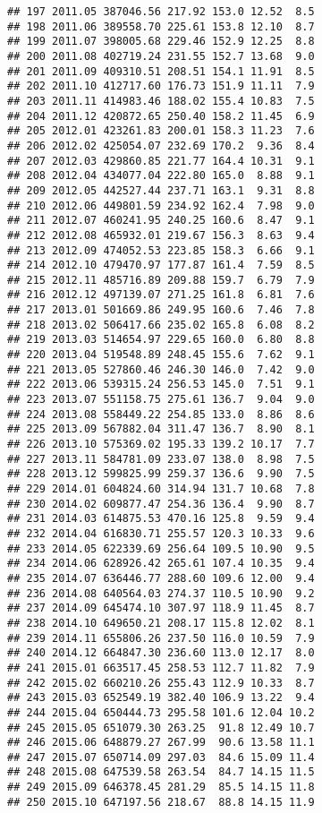 \documentclass[]{article}
\begin{document}
\begin{verbatim}
## 197 2011.05 387046.56 217.92 153.0 12.52  8.5
## 198 2011.06 389558.70 225.61 153.8 12.10  8.7
## 199 2011.07 398005.68 229.46 152.9 12.25  8.8
## 200 2011.08 402719.24 231.55 152.7 13.68  9.0
## 201 2011.09 409310.51 208.51 154.1 11.91  8.5
## 202 2011.10 412717.60 176.73 151.9 11.11  7.9
## 203 2011.11 414983.46 188.02 155.4 10.83  7.5
## 204 2011.12 420872.65 250.40 158.2 11.45  6.9
## 205 2012.01 423261.83 200.01 158.3 11.23  7.6
## 206 2012.02 425054.07 232.69 170.2  9.36  8.4
## 207 2012.03 429860.85 221.77 164.4 10.31  9.1
## 208 2012.04 434077.04 222.80 165.0  8.88  9.1
## 209 2012.05 442527.44 237.71 163.1  9.31  8.8
## 210 2012.06 449801.59 234.92 162.4  7.98  9.0
## 211 2012.07 460241.95 240.25 160.6  8.47  9.1
## 212 2012.08 465932.01 219.67 156.3  8.63  9.4
## 213 2012.09 474052.53 223.85 158.3  6.66  9.1
## 214 2012.10 479470.97 177.87 161.4  7.59  8.5
## 215 2012.11 485716.89 209.88 159.7  6.79  7.9
## 216 2012.12 497139.07 271.25 161.8  6.81  7.6
## 217 2013.01 501669.86 249.95 160.6  7.46  7.8
## 218 2013.02 506417.66 235.02 165.8  6.08  8.2
## 219 2013.03 514654.97 229.65 160.0  6.80  8.8
## 220 2013.04 519548.89 248.45 155.6  7.62  9.1
## 221 2013.05 527860.46 246.30 146.0  7.42  9.0
## 222 2013.06 539315.24 256.53 145.0  7.51  9.1
## 223 2013.07 551158.75 275.61 136.7  9.04  9.0
## 224 2013.08 558449.22 254.85 133.0  8.86  8.6
## 225 2013.09 567882.04 311.47 136.7  8.90  8.1
## 226 2013.10 575369.02 195.33 139.2 10.17  7.7
## 227 2013.11 584781.09 233.07 138.0  8.98  7.5
## 228 2013.12 599825.99 259.37 136.6  9.90  7.5
## 229 2014.01 604824.60 314.94 131.7 10.68  7.8
## 230 2014.02 609877.47 254.36 136.4  9.90  8.7
## 231 2014.03 614875.53 470.16 125.8  9.59  9.4
## 232 2014.04 616830.71 255.57 120.3 10.33  9.6
## 233 2014.05 622339.69 256.64 109.5 10.90  9.5
## 234 2014.06 628926.42 265.61 107.4 10.35  9.4
## 235 2014.07 636446.77 288.60 109.6 12.00  9.4
## 236 2014.08 640564.03 274.37 110.5 10.90  9.2
## 237 2014.09 645474.10 307.97 118.9 11.45  8.7
## 238 2014.10 649650.21 208.17 115.8 12.02  8.1
## 239 2014.11 655806.26 237.50 116.0 10.59  7.9
## 240 2014.12 664847.30 236.60 113.0 12.17  8.0
## 241 2015.01 663517.45 258.53 112.7 11.82  7.9
## 242 2015.02 660210.26 255.43 112.9 10.33  8.7
## 243 2015.03 652549.19 382.40 106.9 13.22  9.4
## 244 2015.04 650444.73 295.58 101.6 12.04 10.2
## 245 2015.05 651079.30 263.25  91.8 12.49 10.7
## 246 2015.06 648879.27 267.99  90.6 13.58 11.1
## 247 2015.07 650714.09 297.03  84.6 15.09 11.4
## 248 2015.08 647539.58 263.54  84.7 14.15 11.5
## 249 2015.09 646378.45 281.29  85.5 14.15 11.8
## 250 2015.10 647197.56 218.67  88.8 14.15 11.9

\end{verbatim}
\end{document}
